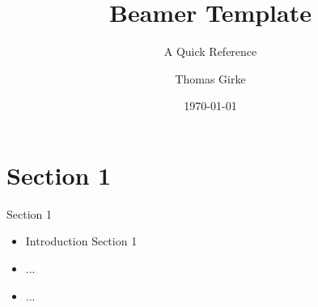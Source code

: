 \documentclass{beamer}
\title{Beamer Template}
\subtitle{A Quick Reference}
\author{Thomas Girke}
\date{\today}
\begin{document}
\frame{\titlepage}
\frame{\tableofcontents}
\section{Section 1}
\begin{frame}{Section 1}
\begin{itemize}
	\item Introduction Section 1
	\item ...
	\item ...
\end{itemize}
\end{frame}
\end{document}
